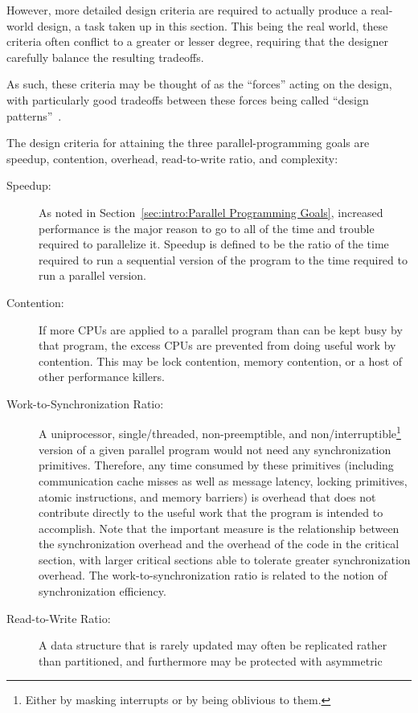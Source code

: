 However, more detailed design criteria are required to
actually produce a real-world design, a task taken up in this section.
This being the real world, these criteria often conflict to a
greater or lesser degree, requiring that the designer carefully
balance the resulting tradeoffs.

As such, these criteria may be thought of as the ``forces''
acting on the design, with particularly good tradeoffs between
these forces being called ``design patterns''~\cite{Alexander79,GOF95}.

\fi

The design criteria for attaining the three parallel-programming goals
are speedup,
contention, overhead, read-to-write ratio, and complexity:
\begin{description}
\item[Speedup:]  As noted in
	Section~\ref{sec:intro:Parallel Programming Goals},
	increased performance is the major reason
	to go to all of the time and trouble
	required to parallelize it.
	Speedup is defined to be the ratio of the time required
	to run a sequential version of the program to the time
	required to run a parallel version.
\item[Contention:]  If more CPUs are applied to a parallel
	program than can be kept busy by that program,
	the excess CPUs are prevented from doing
	useful work by contention.
	This may be lock contention, memory contention, or a host
	of other performance killers.
\item[Work-to-Synchronization Ratio:]  A uniprocessor,
	single\-/threaded, non-preemptible, and non\-/interruptible\footnote{
		Either by masking interrupts or by being oblivious to them.}
	version of a given parallel
	program would not need any synchronization primitives.
	Therefore, any time consumed by these primitives
	(including communication cache misses as well as
	message latency, locking primitives, atomic instructions,
	and memory barriers)
	is overhead that does not contribute directly to the useful
	work that the program is intended to accomplish.
	Note that the important measure is the
	relationship between the synchronization overhead
	and the overhead of the code in the critical section, with larger
	critical sections able to tolerate greater synchronization overhead.
	The work-to-synchronization ratio is related to
	the notion of synchronization efficiency.
\item[Read-to-Write Ratio:]  A data structure that is
	rarely updated may often be replicated rather than partitioned,
	and furthermore may be protected with asymmetric

\end{description}
